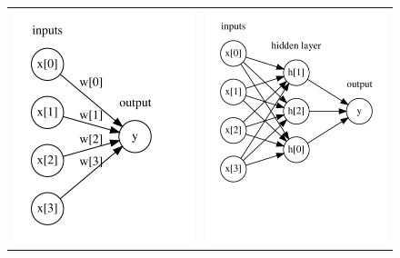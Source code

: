 \begin{figure}[h]
    \centering
    \begin{tabular}{cc}
        \includegraphics[page=1,width=.45\textwidth]{../Codes/Figures/Visualization of logistic regression.pdf} &
        \includegraphics[page=1,width=.45\textwidth]{../Codes/Figures/A multilayer perceptron with two hidden layers.pdf} \\
    \end{tabular}
    \caption{}
    \label{}
\end{figure}